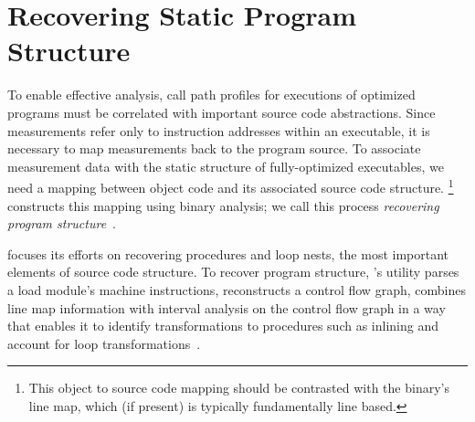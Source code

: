 \documentclass[11pt,letterpaper]{report}
\begin{document}

\section{Recovering Static Program Structure}

To enable effective analysis, call path profiles for executions of optimized programs must be correlated with important source code abstractions.
Since measurements refer only to instruction addresses within an executable, it is necessary to map measurements back to the program source.
To associate measurement data with the static structure of fully-optimized executables, we need a mapping between object code and its associated source code structure.%
\footnote{This object to source code mapping should be contrasted with the binary's line map, which (if present) is typically fundamentally line based.}
\HPCToolkit{} constructs this mapping using binary analysis; we call this process \emph{recovering program structure}~\cite{Tallent-MC-Fagan:2009:PLDI-hpctoolkit-binary-analysis}.

\HPCToolkit{} focuses its efforts on recovering procedures and loop nests, the most important elements of source code structure.
To recover program structure, \HPCToolkit's \hpcstruct{} utility parses a load module's machine instructions, reconstructs a control flow graph, combines line map information with interval analysis on the control flow graph in a way that enables it to identify transformations to procedures such as inlining and account for loop transformations~\cite{Tallent-MC-Fagan:2009:PLDI-hpctoolkit-binary-analysis}.
\end{document}
